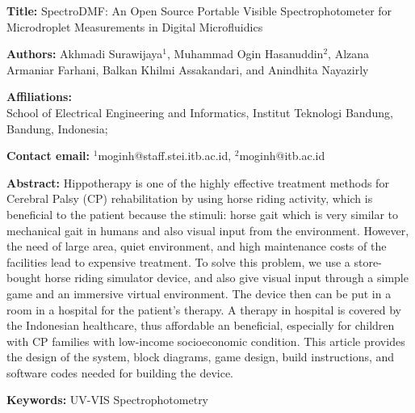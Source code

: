 \documentclass[11pt, letterpaper]{article}
\begin{document}
\begin{flushleft}
\setlength{\parindent}{0pt}
\setlength{\parskip}{10pt}

\textbf{Title:} SpectroDMF: An Open Source Portable Visible Spectrophotometer for Microdroplet Measurements in Digital Microfluidics

\textbf{Authors:} Akhmadi Surawijaya$^1$, Muhammad Ogin Hasanuddin$^2$, Alzana Armaniar Farhani, Balkan Khilmi Assakandari, and Anindhita Nayazirly

\textbf{Affiliations:}\\
School of Electrical Engineering and Informatics, Institut Teknologi Bandung, Bandung, Indonesia;

\textbf{Contact email:} $^1$moginh@staff.stei.itb.ac.id, $^2$moginh@itb.ac.id

\textbf{Abstract:} Hippotherapy is one of the highly effective treatment methods for Cerebral Palsy (CP) rehabilitation by using horse riding activity, which is beneficial to the patient because the stimuli: horse gait which is very similar to mechanical gait in humans and also visual input from the environment. However, the need of large area, quiet environment, and high maintenance costs of the facilities lead to expensive treatment. To solve this problem, we use a store-bought horse riding simulator device, and also give visual input through a simple game and an immersive virtual environment. The device then can be put in a room in a hospital for the patient's therapy. A therapy in hospital is covered by the Indonesian healthcare, thus affordable an beneficial, especially for children with CP families with low-income socioeconomic condition. This article provides the design of the system, block diagrams, game design, build instructions, and software codes needed for building the device.

\textbf{Keywords:} UV-VIS Spectrophotometry


\newpage







% 


\end{flushleft}
\end{document}
